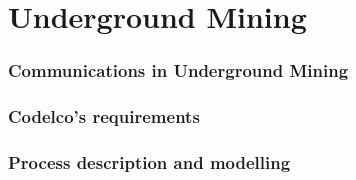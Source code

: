 \documentclass[10pt,preprint,onecolumn]{article}
\begin{document}
\part{Underground Mining}



\section{Communications in Underground Mining}

\section{Codelco's requirements}

\section{Process description and modelling}




\end{document}
